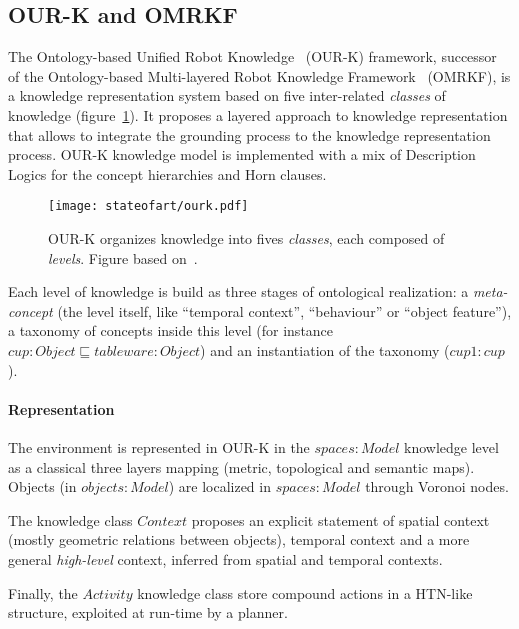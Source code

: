 \subsection{OUR-K and OMRKF}
\label{sect|omrkf}

The Ontology-based Unified Robot Knowledge~\cite{Lim2011} (OUR-K) framework,
successor of the Ontology-based Multi-layered Robot Knowledge
Framework~\cite{Suh2007} (OMRKF), is a knowledge representation system based on
five inter-related \emph{classes} of knowledge (figure~\ref{fig|omrkf}). It
proposes a layered approach to knowledge representation that allows to
integrate the grounding process to the knowledge representation process. OUR-K
knowledge model is implemented with a mix of Description Logics for the concept
hierarchies and Horn clauses.

\begin{figure}
    \centering
    \texttt{[image: stateofart/ourk.pdf]}

    \caption{OUR-K organizes knowledge into fives \emph{classes}, each composed
    of \emph{levels}. Figure based on~\cite{Lim2011}.}

    \label{fig|omrkf}
\end{figure}

Each level of knowledge is build as three stages of ontological realization: a
\emph{meta-concept} (the level itself, like ``temporal context'', ``behaviour''
or ``object feature''), a taxonomy of concepts inside this level (for instance
$cup : Object \sqsubseteq tableware : Object$) and an instantiation of the
taxonomy ($cup1 : cup$).

\paragraph{Representation} The environment is represented in OUR-K in the
$spaces : Model$ knowledge level as a classical three layers mapping (metric,
topological and semantic maps). Objects (in $objects : Model$) are localized in
$spaces : Model$ through Voronoi nodes.

The knowledge class $Context$ proposes an explicit statement of spatial context
(mostly geometric relations between objects), temporal context and a more
general \emph{high-level} context, inferred from spatial and temporal contexts.

Finally, the $Activity$ knowledge class store compound actions in a HTN-like
structure, exploited at run-time by a planner.

